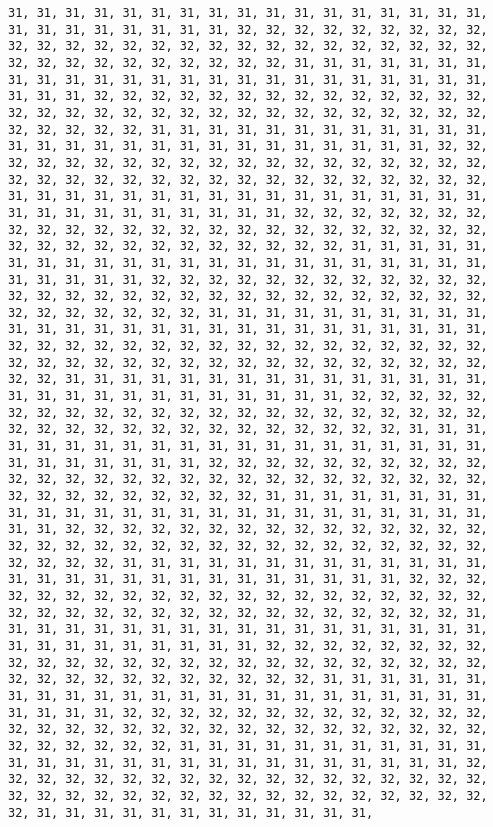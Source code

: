 \documentclass[
]{book}
\begin{document}
\begin{verbatim}
31, 31, 31, 31, 31, 31, 31, 31, 31, 31, 31, 31, 31, 31, 31, 31, 31, 31, 31, 31, 31, 31, 31, 31, 31, 32, 32, 32, 32, 32, 32, 32, 32, 32, 32, 32, 32, 32, 32, 32, 32, 32, 32, 32, 32, 32, 32, 32, 32, 32, 32, 32, 32, 32, 32, 32, 32, 32, 32, 32, 32, 31, 31, 31, 31, 31, 31, 31, 31, 31, 31, 31, 31, 31, 31, 31, 31, 31, 31, 31, 31, 31, 31, 31, 31, 31, 31, 31, 32, 32, 32, 32, 32, 32, 32, 32, 32, 32, 32, 32, 32, 32, 32, 32, 32, 32, 32, 32, 32, 32, 32, 32, 32, 32, 32, 32, 32, 32, 32, 32, 32, 32, 32, 32, 31, 31, 31, 31, 31, 31, 31, 31, 31, 31, 31, 31, 31, 31, 31, 31, 31, 31, 31, 31, 31, 31, 31, 31, 31, 31, 31, 32, 32, 32, 32, 32, 32, 32, 32, 32, 32, 32, 32, 32, 32, 32, 32, 32, 32, 32, 32, 32, 32, 32, 32, 32, 32, 32, 32, 32, 32, 32, 32, 32, 32, 32, 32, 31, 31, 31, 31, 31, 31, 31, 31, 31, 31, 31, 31, 31, 31, 31, 31, 31, 31, 31, 31, 31, 31, 31, 31, 31, 31, 31, 32, 32, 32, 32, 32, 32, 32, 32, 32, 32, 32, 32, 32, 32, 32, 32, 32, 32, 32, 32, 32, 32, 32, 32, 32, 32, 32, 32, 32, 32, 32, 32, 32, 32, 32, 32, 31, 31, 31, 31, 31, 31, 31, 31, 31, 31, 31, 31, 31, 31, 31, 31, 31, 31, 31, 31, 31, 31, 31, 31, 31, 31, 31, 32, 32, 32, 32, 32, 32, 32, 32, 32, 32, 32, 32, 32, 32, 32, 32, 32, 32, 32, 32, 32, 32, 32, 32, 32, 32, 32, 32, 32, 32, 32, 32, 32, 32, 32, 32, 31, 31, 31, 31, 31, 31, 31, 31, 31, 31, 31, 31, 31, 31, 31, 31, 31, 31, 31, 31, 31, 31, 31, 31, 31, 31, 31, 32, 32, 32, 32, 32, 32, 32, 32, 32, 32, 32, 32, 32, 32, 32, 32, 32, 32, 32, 32, 32, 32, 32, 32, 32, 32, 32, 32, 32, 32, 32, 32, 32, 32, 32, 32, 31, 31, 31, 31, 31, 31, 31, 31, 31, 31, 31, 31, 31, 31, 31, 31, 31, 31, 31, 31, 31, 31, 31, 31, 31, 31, 31, 32, 32, 32, 32, 32, 32, 32, 32, 32, 32, 32, 32, 32, 32, 32, 32, 32, 32, 32, 32, 32, 32, 32, 32, 32, 32, 32, 32, 32, 32, 32, 32, 32, 32, 32, 32, 31, 31, 31, 31, 31, 31, 31, 31, 31, 31, 31, 31, 31, 31, 31, 31, 31, 31, 31, 31, 31, 31, 31, 31, 31, 31, 31, 32, 32, 32, 32, 32, 32, 32, 32, 32, 32, 32, 32, 32, 32, 32, 32, 32, 32, 32, 32, 32, 32, 32, 32, 32, 32, 32, 32, 32, 32, 32, 32, 32, 32, 32, 32, 31, 31, 31, 31, 31, 31, 31, 31, 31, 31, 31, 31, 31, 31, 31, 31, 31, 31, 31, 31, 31, 31, 31, 31, 31, 31, 31, 32, 32, 32, 32, 32, 32, 32, 32, 32, 32, 32, 32, 32, 32, 32, 32, 32, 32, 32, 32, 32, 32, 32, 32, 32, 32, 32, 32, 32, 32, 32, 32, 32, 32, 32, 32, 31, 31, 31, 31, 31, 31, 31, 31, 31, 31, 31, 31, 31, 31, 31, 31, 31, 31, 31, 31, 31, 31, 31, 31, 31, 31, 31, 32, 32, 32, 32, 32, 32, 32, 32, 32, 32, 32, 32, 32, 32, 32, 32, 32, 32, 32, 32, 32, 32, 32, 32, 32, 32, 32, 32, 32, 32, 32, 32, 32, 32, 32, 32, 31, 31, 31, 31, 31, 31, 31, 31, 31, 31, 31, 31, 31, 31, 31, 31, 31, 31, 31, 31, 31, 31, 31, 31, 31, 31, 31, 32, 32, 32, 32, 32, 32, 32, 32, 32, 32, 32, 32, 32, 32, 32, 32, 32, 32, 32, 32, 32, 32, 32, 32, 32, 32, 32, 32, 32, 32, 32, 32, 32, 32, 32, 32, 31, 31, 31, 31, 31, 31, 31, 31, 31, 31, 31, 31, 31, 31, 31, 31, 31, 31, 31, 31, 31, 31, 31, 31, 31, 31, 31, 32, 32, 32, 32, 32, 32, 32, 32, 32, 32, 32, 32, 32, 32, 32, 32, 32, 32, 32, 32, 32, 32, 32, 32, 32, 32, 32, 32, 32, 32, 32, 32, 32, 32, 32, 32, 31, 31, 31, 31, 31, 31, 31, 31, 31, 31, 31, 31, 31, 31, 31, 31, 31, 31, 31, 31, 31, 31, 31, 31, 31, 31, 31, 32, 32, 32, 32, 32, 32, 32, 32, 32, 32, 32, 32, 32, 32, 32, 32, 32, 32, 32, 32, 32, 32, 32, 32, 32, 32, 32, 32, 32, 32, 32, 32, 32, 32, 32, 32, 31, 31, 31, 31, 31, 31, 31, 31, 31, 31, 31, 31, 
\end{verbatim}
\end{document}
